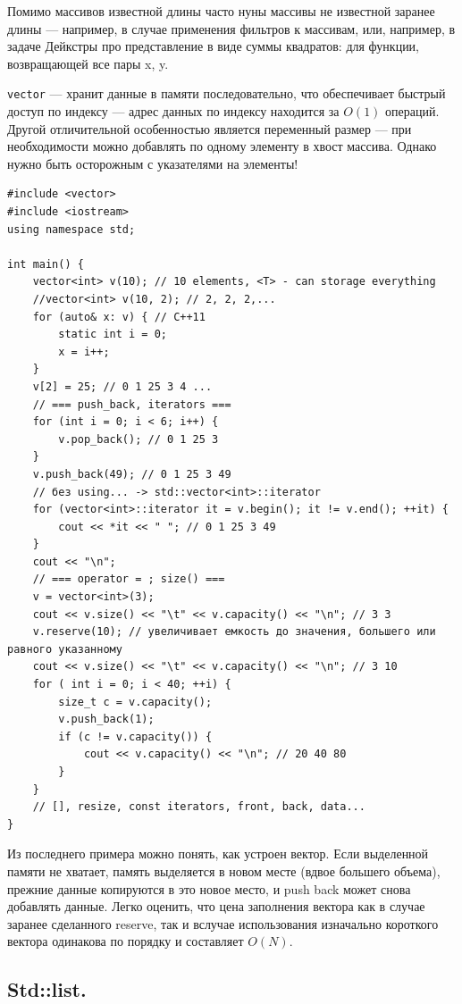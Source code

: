 \documentclass{book}
\begin{document}
Помимо массивов известной длины часто нуны массивы не известной заранее длины --- например, в
случае применения фильтров к массивам, или, например, в задаче Дейкстры про представление в виде
суммы квадратов: для функции, возвращающей все пары x, y.

\texttt{vector} --- хранит данные в памяти последовательно, что обеспечивает быстрый
доступ по индексу --- адрес данных по индексу находится за $O(1)$ операций. Другой отличительной
особенностью является переменный размер --- при необходимости можно добавлять по одному элементу в
хвост массива. Однако нужно быть осторожным с указателями на элементы!
\begin{verbatim}
#include <vector>
#include <iostream>
using namespace std;

int main() {
    vector<int> v(10); // 10 elements, <T> - can storage everything
    //vector<int> v(10, 2); // 2, 2, 2,...
    for (auto& x: v) { // C++11
        static int i = 0;
        x = i++;
    }
    v[2] = 25; // 0 1 25 3 4 ...
    // === push_back, iterators ===
    for (int i = 0; i < 6; i++) {
        v.pop_back(); // 0 1 25 3
    }
    v.push_back(49); // 0 1 25 3 49
    // без using... -> std::vector<int>::iterator
    for (vector<int>::iterator it = v.begin(); it != v.end(); ++it) {
        cout << *it << " "; // 0 1 25 3 49
    }
    cout << "\n";
    // === operator = ; size() ===
    v = vector<int>(3);
    cout << v.size() << "\t" << v.capacity() << "\n"; // 3 3
    v.reserve(10); // увеличивает емкость до значения, большего или равного указанному
    cout << v.size() << "\t" << v.capacity() << "\n"; // 3 10
    for ( int i = 0; i < 40; ++i) {
        size_t c = v.capacity();
        v.push_back(1);
        if (c != v.capacity()) {
            cout << v.capacity() << "\n"; // 20 40 80
        }
    }
    // [], resize, const iterators, front, back, data...
}
\end{verbatim}

Из последнего примера можно понять, как устроен вектор. Если выделенной памяти не хватает, память
выделяется в новом месте (вдвое большего объема), прежние данные копируются в это новое место, и
push back может снова добавлять данные. Легко оценить, что цена заполнения вектора как в случае
заранее сделанного reserve, так и вслучае использования изначально короткого вектора одинакова по
порядку и составляет $O(N)$.

\subsection{Std::list.}
\end{document}
